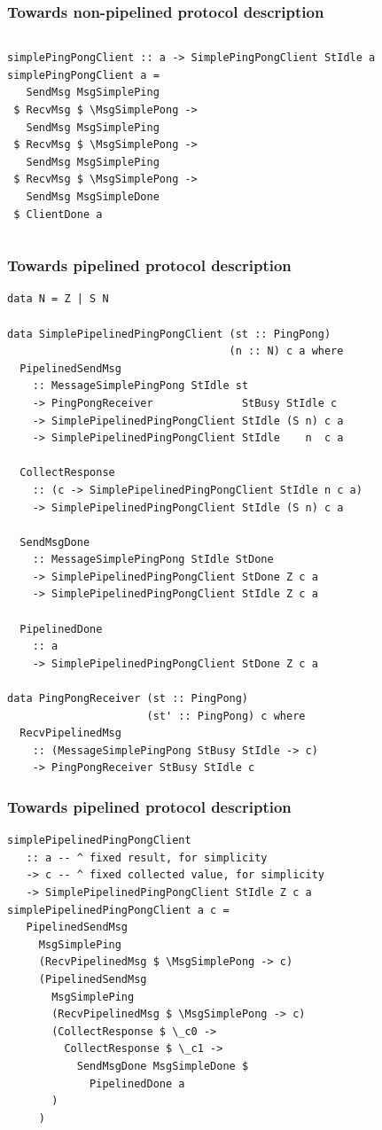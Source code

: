 \documentclass[t,dvipsnames]{beamer}
\begin{document}
\begin{frame}[fragile]
  \frametitle{Towards non-pipelined protocol description}
  \begin{columns}[t]
    \begin{column}{1.0\textwidth}
      \begin{verbatim}
simplePingPongClient :: a -> SimplePingPongClient StIdle a
simplePingPongClient a =
   SendMsg MsgSimplePing
 $ RecvMsg $ \MsgSimplePong ->
   SendMsg MsgSimplePing
 $ RecvMsg $ \MsgSimplePong ->
   SendMsg MsgSimplePing
 $ RecvMsg $ \MsgSimplePong ->
   SendMsg MsgSimpleDone
 $ ClientDone a
      \end{verbatim}
    \end{column}
  \end{columns}
\end{frame}

\begin{frame}[fragile]
  \frametitle{Towards pipelined protocol description}
      \begin{verbatim}
data N = Z | S N

data SimplePipelinedPingPongClient (st :: PingPong)
                                   (n :: N) c a where
  PipelinedSendMsg
    :: MessageSimplePingPong StIdle st
    -> PingPongReceiver              StBusy StIdle c
    -> SimplePipelinedPingPongClient StIdle (S n) c a
    -> SimplePipelinedPingPongClient StIdle    n  c a

  CollectResponse
    :: (c -> SimplePipelinedPingPongClient StIdle n c a)
    -> SimplePipelinedPingPongClient StIdle (S n) c a

  SendMsgDone
    :: MessageSimplePingPong StIdle StDone
    -> SimplePipelinedPingPongClient StDone Z c a
    -> SimplePipelinedPingPongClient StIdle Z c a

  PipelinedDone
    :: a
    -> SimplePipelinedPingPongClient StDone Z c a

data PingPongReceiver (st :: PingPong)
                      (st' :: PingPong) c where
  RecvPipelinedMsg
    :: (MessageSimplePingPong StBusy StIdle -> c)
    -> PingPongReceiver StBusy StIdle c
      \end{verbatim}
\end{frame}

\begin{frame}[fragile]
  \frametitle{Towards pipelined protocol description}

  \begin{verbatim}
simplePipelinedPingPongClient
   :: a -- ^ fixed result, for simplicity
   -> c -- ^ fixed collected value, for simplicity
   -> SimplePipelinedPingPongClient StIdle Z c a
simplePipelinedPingPongClient a c =
   PipelinedSendMsg
     MsgSimplePing
     (RecvPipelinedMsg $ \MsgSimplePong -> c)
     (PipelinedSendMsg
       MsgSimplePing
       (RecvPipelinedMsg $ \MsgSimplePong -> c)
       (CollectResponse $ \_c0 ->
         CollectResponse $ \_c1 ->
           SendMsgDone MsgSimpleDone $
             PipelinedDone a
       )
     )
  \end{verbatim}
\end{frame}
\end{document}
